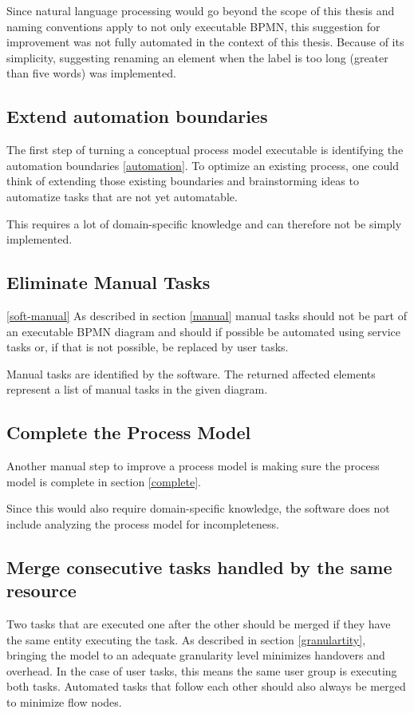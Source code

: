 Since natural language processing would go beyond the scope of this thesis and naming conventions apply to not only executable BPMN, this suggestion for improvement was not fully automated in the context of this thesis. Because of its simplicity, suggesting renaming an element when the label is too long (greater than five words) was implemented.

\subsection{Extend automation boundaries}
The first step of turning a conceptual process model executable is identifying the automation boundaries \ref{automation}. To optimize an existing process, one could think of extending those existing boundaries and brainstorming ideas to automatize tasks that are not yet automatable. 

This requires a lot of domain-specific knowledge and can therefore not be simply implemented.

\subsection{Eliminate Manual Tasks}\ref{soft-manual}
As described in section \ref{manual} manual tasks should not be part of an executable BPMN diagram and should if possible be automated using service tasks or, if that is not possible, be replaced by user tasks. 

Manual tasks are identified by the software. The returned affected elements represent a list of manual tasks in the given diagram.

\subsection{Complete the Process Model}
Another manual step to improve a process model is making sure the process model is complete in section \ref{complete}.

Since this would also require domain-specific knowledge, the software does not include analyzing the process model for incompleteness.

\subsection{Merge consecutive tasks handled by the same resource}\label{merge-section}
Two tasks that are executed one after the other should be merged if they have the same entity executing the task. As described in section \ref{granulartity}, bringing the model to an adequate granularity level minimizes handovers and overhead. In the case of user tasks, this means the same user group is executing both tasks. Automated tasks that follow each other should also always be merged to minimize flow nodes.


